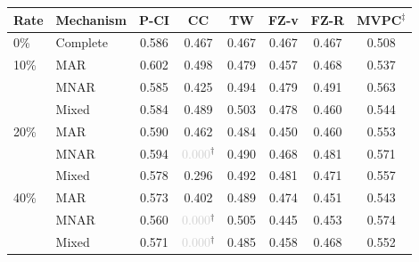 \begin{tabular}{llcccccc}
    \toprule
    Rate & Mechanism & P-CI & CC & TW & FZ-v & FZ-R & MVPC$^\ddagger$ \\
    \midrule
    0\% & Complete & 0.586 & 0.467 & 0.467 & 0.467 & 0.467 & 0.508 \\
    \midrule
    10\% & MAR   & 0.602 & 0.498 & 0.479 & 0.457 & 0.468 & 0.537 \\
         & MNAR  & 0.585 & 0.425 & 0.494 & 0.479 & 0.491 & 0.563 \\
         & Mixed & 0.584 & 0.489 & 0.503 & 0.478 & 0.460 & 0.544 \\
    \midrule
    20\% & MAR   & 0.590 & 0.462 & 0.484 & 0.450 & 0.460 & 0.553 \\
         & MNAR  & 0.594 & \textcolor{lightgray}{0.000}$^\dagger$ & 0.490 & 0.468 & 0.481 & 0.571 \\
         & Mixed & 0.578 & 0.296 & 0.492 & 0.481 & 0.471 & 0.557 \\
    \midrule
    40\% & MAR   & 0.573 & 0.402 & 0.489 & 0.474 & 0.451 & 0.543 \\
         & MNAR  & 0.560 & \textcolor{lightgray}{0.000}$^\dagger$ & 0.505 & 0.445 & 0.453 & 0.574 \\
         & Mixed & 0.571 & \textcolor{lightgray}{0.000}$^\dagger$ & 0.485 & 0.458 & 0.468 & 0.552 \\
    \bottomrule
\end{tabular}
